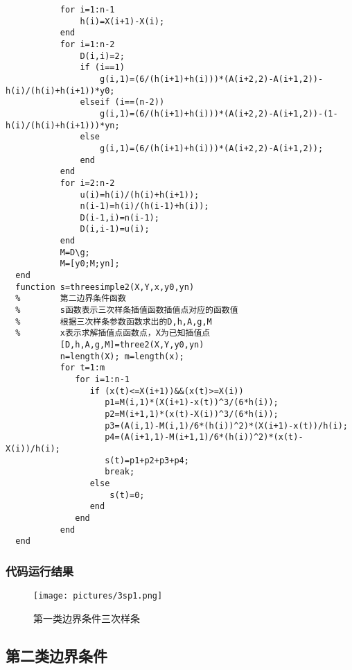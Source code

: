 \documentclass[UTF8,a4paper,10pt]{ctexart}
\begin{document}
\begin{lstlisting}
           for i=1:n-1
               h(i)=X(i+1)-X(i);
           end        
           for i=1:n-2
               D(i,i)=2;
               if (i==1)
                   g(i,1)=(6/(h(i+1)+h(i)))*(A(i+2,2)-A(i+1,2))-h(i)/(h(i)+h(i+1))*y0;
               elseif (i==(n-2))
                   g(i,1)=(6/(h(i+1)+h(i)))*(A(i+2,2)-A(i+1,2))-(1-h(i)/(h(i)+h(i+1)))*yn;
               else
                   g(i,1)=(6/(h(i+1)+h(i)))*(A(i+2,2)-A(i+1,2));
               end             
           end
           for i=2:n-2
               u(i)=h(i)/(h(i)+h(i+1));
               n(i-1)=h(i)/(h(i-1)+h(i));
               D(i-1,i)=n(i-1);
               D(i,i-1)=u(i);             
           end
           M=D\g;
           M=[y0;M;yn];         
  end
  function s=threesimple2(X,Y,x,y0,yn)
  %        第二边界条件函数 
  %        s函数表示三次样条插值函数插值点对应的函数值
  %        根据三次样条参数函数求出的D,h,A,g,M
  %        x表示求解插值点函数点，X为已知插值点        
           [D,h,A,g,M]=three2(X,Y,y0,yn)
           n=length(X); m=length(x);    
           for t=1:m
              for i=1:n-1
                 if (x(t)<=X(i+1))&&(x(t)>=X(i))
                    p1=M(i,1)*(X(i+1)-x(t))^3/(6*h(i));
                    p2=M(i+1,1)*(x(t)-X(i))^3/(6*h(i));
                    p3=(A(i,1)-M(i,1)/6*(h(i))^2)*(X(i+1)-x(t))/h(i);
                    p4=(A(i+1,1)-M(i+1,1)/6*(h(i))^2)*(x(t)-X(i))/h(i);
                    s(t)=p1+p2+p3+p4; 
                    break;
                 else
                     s(t)=0; 
                 end
              end
           end
  end
\end{lstlisting}
\subsubsection{代码运行结果}
	\begin{figure}[!htbp]
		\centering
		\texttt{[image: pictures/3sp1.png]}
		\caption{第一类边界条件三次样条} \label{3sp1}
	\end{figure}


  \subsection{第二类边界条件}
\end{document}

